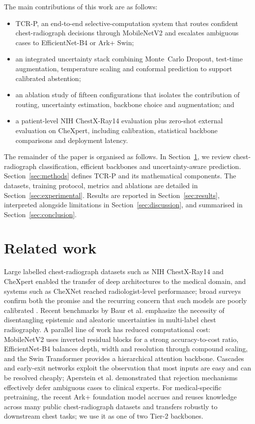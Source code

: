 \documentclass[pdflatex,sn-nature]{sn-jnl}
\begin{document}
The main contributions of this work are as follows:
\begin{itemize}
\item TCR-P, an end-to-end selective-computation system that routes confident chest-radiograph decisions through MobileNetV2 and escalates ambiguous cases to EfficientNet-B4 or Ark+ Swin;
\item an integrated uncertainty stack combining Monte~Carlo Dropout, test-time augmentation, temperature scaling and conformal prediction to support calibrated abstention;
\item an ablation study of fifteen configurations that isolates the contribution of routing, uncertainty estimation, backbone choice and augmentation; and
\item a patient-level NIH ChestX-Ray14 evaluation plus zero-shot external evaluation on CheXpert, including calibration, statistical backbone comparisons and deployment latency.
\end{itemize}

The remainder of the paper is organised as follows. In Section~\ref{sec:related}, we review chest-radiograph classification, efficient backbones and uncertainty-aware prediction. Section~\ref{sec:methods} defines TCR-P and its mathematical components. The datasets, training protocol, metrics and ablations are detailed in Section~\ref{sec:experimental}. Results are reported in Section~\ref{sec:results}, interpreted alongside limitations in Section~\ref{sec:discussion}, and summarised in Section~\ref{sec:conclusion}.

\section{Related work}\label{sec:related}

Large labelled chest-radiograph datasets such as NIH ChestX-Ray14 \cite{wang2017chestxray} and CheXpert \cite{irvin2019chexpert} enabled the transfer of deep architectures to the medical domain, and systems such as CheXNet \cite{rajpurkar2018chexnext} reached radiologist-level performance; broad surveys confirm both the promise and the recurring concern that such models are poorly calibrated \cite{litjens2017survey}. Recent benchmarks by Baur et al. \cite{baur2025benchmarking} emphasize the necessity of disentangling epistemic and aleatoric uncertainties in multi-label chest radiography. A parallel line of work has reduced computational cost: MobileNetV2 \cite{sandler2018mobilenetv2} uses inverted residual blocks for a strong accuracy-to-cost ratio, EfficientNet-B4 \cite{tan2019efficientnet} balances depth, width and resolution through compound scaling, and the Swin Transformer \cite{liu2021swin} provides a hierarchical attention backbone. Cascades and early-exit networks exploit the observation that most inputs are easy and can be resolved cheaply; Aperstein et al. \cite{aperstein2025multipathology} demonstrated that rejection mechanisms effectively defer ambiguous cases to clinical experts. For medical-specific pretraining, the recent Ark+ foundation model \cite{ma2025arkplus} accrues and reuses knowledge across many public chest-radiograph datasets and transfers robustly to downstream chest tasks; we use it as one of two Tier-2 backbones.
\end{document}
